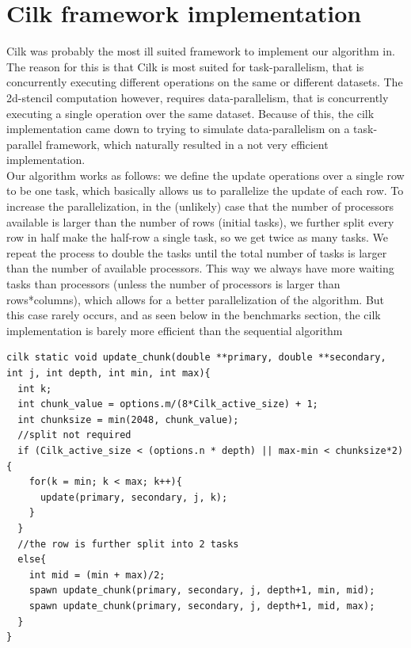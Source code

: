 \documentclass[11pt]{article}
\begin{document}
\section{Cilk framework implementation}
Cilk was probably the most ill suited framework to implement our algorithm in. The reason for this is that Cilk is most suited for task-parallelism,
that is concurrently executing different operations on the same or different datasets. The 2d-stencil computation however, requires data-parallelism,
that is concurrently executing a single operation over the same dataset. Because of this, the cilk implementation came down to trying to simulate 
data-parallelism on a task-parallel framework, which naturally resulted in a not very efficient implementation.\\
Our algorithm works as follows: we define the update operations over a single row to be one task, which basically allows us to parallelize the update of each row.
To increase the parallelization, in the (unlikely) case that the number of processors available is larger than the number of rows (initial tasks), we further split
every row in half make the half-row a single task, so we get twice as many tasks. We repeat the process to double the tasks until the total number of tasks is larger than the
number of available processors. This way we always have more waiting tasks than processors (unless the number of processors is larger than rows*columns), which allows for a better
parallelization of the algorithm. But this case rarely occurs, and as seen below in the benchmarks section, the cilk implementation is barely more efficient than the sequential algorithm
\begin{lstlisting}[label=some-code, caption=The data-parallel update task]
cilk static void update_chunk(double **primary, double **secondary, 
int j, int depth, int min, int max){ 
  int k;
  int chunk_value = options.m/(8*Cilk_active_size) + 1; 
  int chunksize = min(2048, chunk_value);
  //split not required
  if (Cilk_active_size < (options.n * depth) || max-min < chunksize*2){ 
    for(k = min; k < max; k++){
      update(primary, secondary, j, k);
    }
  }
  //the row is further split into 2 tasks
  else{
    int mid = (min + max)/2;   
    spawn update_chunk(primary, secondary, j, depth+1, min, mid);
    spawn update_chunk(primary, secondary, j, depth+1, mid, max);
  }
}
\end{lstlisting}
\end{document}
